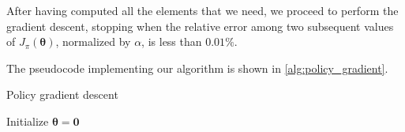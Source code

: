 After having computed all the elements that we need, we proceed to perform the gradient descent, stopping when the relative error among two subsequent values of $J_\pi (\boldsymbol \theta)$, normalized by $\alpha$, is less than $0.01\%$.

The pseudocode implementing our algorithm is shown in \autoref{alg:policy_gradient}.

\begin{algorithm}
    \DontPrintSemicolon
    \caption{Policy gradient descent}
    \label{alg:policy_gradient}
        Initialize $\boldsymbol \theta = \mathbf 0$\;
\end{algorithm}